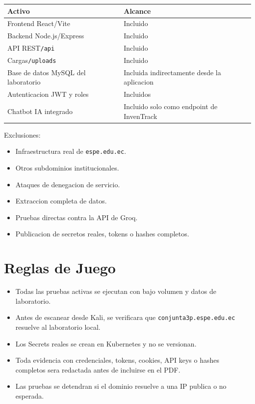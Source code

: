 {\def\LTcaptype{none} %
\label{tab:activos-alcance}
\begin{longtable}[]{@{}ll@{}}
\toprule\noalign{}
Activo & Alcance \\
\midrule\noalign{}
\endhead
\bottomrule\noalign{}
\endlastfoot
Frontend React/Vite & Incluido \\
Backend Node.js/Express & Incluido \\
API REST\texttt{/api} & Incluido \\
Cargas\texttt{/uploads} & Incluido \\
Base de datos MySQL del laboratorio & Incluida indirectamente desde la aplicacion \\
Autenticacion JWT y roles & Incluidos \\
Chatbot IA integrado & Incluido solo como endpoint de InvenTrack \\
\end{longtable}
}

Exclusiones:

\begin{itemize}
\tightlist
\item
  Infraestructura real de \texttt{espe.edu.ec}.
\item
  Otros subdominios institucionales.
\item
  Ataques de denegacion de servicio.
\item
  Extraccion completa de datos.
\item
  Pruebas directas contra la API de Groq.
\item
  Publicacion de secretos reales, tokens o hashes completos.
\end{itemize}

\section{Reglas de Juego}\label{reglas-de-juego}

\begin{itemize}
\tightlist
\item
  Todas las pruebas activas se ejecutan con bajo volumen y datos de laboratorio.
\item
  Antes de escanear desde Kali, se verificara que \texttt{conjunta3p.espe.edu.ec} resuelve al laboratorio local.
\item
  Los Secrets reales se crean en Kubernetes y no se versionan.
\item
  Toda evidencia con credenciales, tokens, cookies, API keys o hashes completos sera redactada antes de incluirse en el PDF.
\item
  Las pruebas se detendran si el dominio resuelve a una IP publica o no esperada.
\end{itemize}

